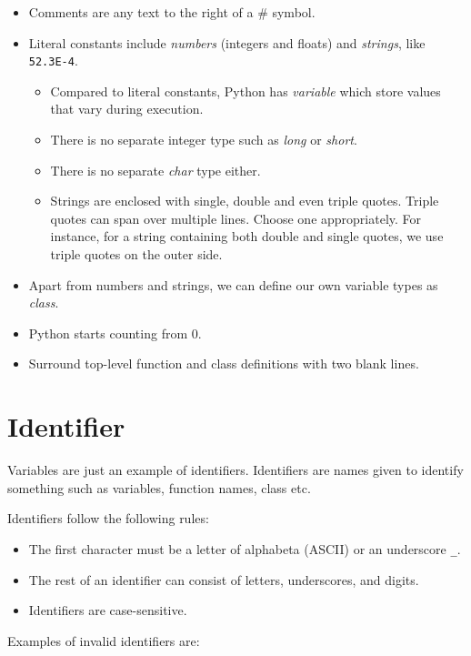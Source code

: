 \begin{itemize}
\item Comments are any text to the right of a \# symbol.
\item Literal constants include \textit{numbers} (integers and
  floats) and \textit{strings}, like \verb|52.3E-4|.
  \begin{itemize}
  \item Compared to literal constants, Python has
    \textit{variable} which store values that vary during execution.
  \item There is no separate integer type such as \textit{long} or
  \textit{short}.
  \item There is no separate \textit{char} type either.
  \item Strings are enclosed with single, double and even triple
    quotes. Triple quotes can span over multiple lines. Choose one
    appropriately. For instance, for a string containing both
    double and single quotes, we use triple quotes on the outer side.
  \end{itemize}
\item Apart from numbers and strings, we can define our own
  variable types as \textit{class}.
\item Python starts counting from $0$.
\item Surround top-level function and class definitions with two blank lines.
\end{itemize}

\section{Identifier}
\label{sec:py-identifier}

Variables are just an example of identifiers. Identifiers are
names given to identify something such as variables, function
names, class etc.

Identifiers follow the following rules:

\begin{itemize}
\item The first character must be a letter of alphabeta (ASCII) or an
  underscore \verb|_|.
\item The rest of an identifier can consist of letters,
  underscores, and digits.
\item Identifiers are case-sensitive.
\end{itemize}

Examples of invalid identifiers are:

